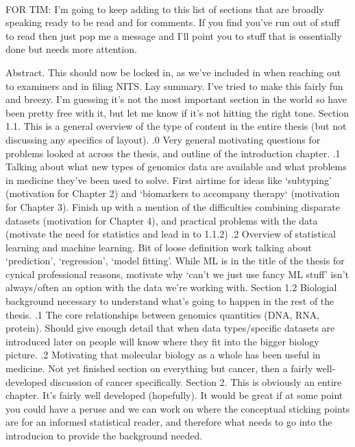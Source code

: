 \documentclass[12pt,twoside,openright]{report}
\theoremstyle{definition}
\begin{document}
\tableofcontents
~\\
{\color{red} FOR TIM:
I'm going to keep adding to this list of sections that are broadly speaking ready to be read and for comments. If you find you've run out of stuff to read then just pop me a message and I'll point you to stuff that is essentially done but needs more attention.
\begin{outline}
    \1 Abstract. This should now be locked in, as we've included in when reaching out to examiners and in filing NITS.
    \1 Lay summary. I've tried to make this fairly fun and breezy. I'm guessing it's not the most important section in the world so have been pretty free with it, but let me know if it's not hitting the right tone.
    \1 Section 1.1. This is a general overview of the type of content in the entire thesis (but not discussing any specifics of layout).
        .0 Very general motivating questions for problems looked at across the thesis, and outline of the introduction chapter.
        .1 Talking about what new types of genomics data are available and what problems in medicine they've been used to solve. First airtime for ideas like `subtyping' (motivation for Chapter 2) and `biomarkers to accompany therapy` (motivation for Chapter 3). Finish up with a mention of the difficulties combining disparate datasets (motivation for Chapter 4), and practical problems with the data (motivate the need for statistics and lead in to 1.1.2)
        .2 Overview of statistical learning and machine learning. Bit of loose definition work talking about `prediction', `regression', `model fitting'. While ML is in the title of the thesis for cynical professional reasons, motivate why `can't we just use fancy ML stuff' isn't always/often an option with the data we're working with.
    \1 Section 1.2 Biologial background necessary to understand what's going to happen in the rest of the thesis.
        .1 The core relationships between genomics quantities (DNA, RNA, protein). Should give enough detail that when data types/specific datasets are introduced later on people will know where they fit into the bigger biology picture.
        .2 Motivating that molecular biology as a whole has been useful in medicine. Not yet finished section on everything but cancer, then a fairly well-developed discussion of cancer specifically.
    \1 Section 2. This is obviously an entire chapter. It's fairly well developed (hopefully). It would be great if at some point you could have a peruse and we can work on where the conceptual sticking points are for an informed statistical reader, and therefore what needs to go into the introducion to provide the background needed.

\end{outline}}
\end{document}
